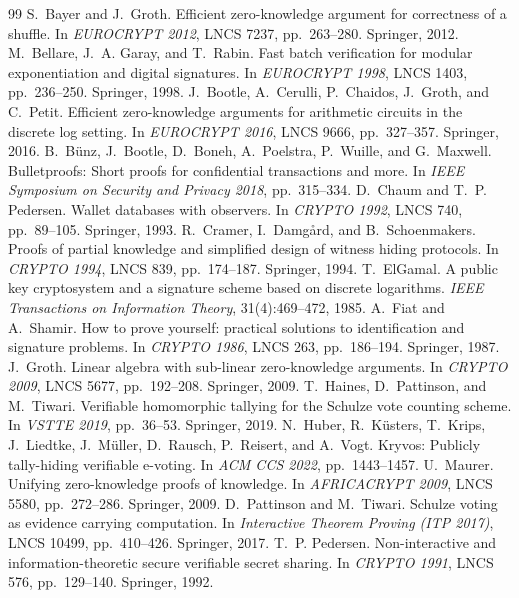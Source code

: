 \documentclass[11pt,a4paper]{article}
\theoremstyle{remark}
\begin{document}
\begin{thebibliography}{99}\small
{} S.~Bayer and J.~Groth. Efficient zero-knowledge argument for correctness of a shuffle. In \emph{EUROCRYPT 2012}, LNCS 7237, pp.~263--280. Springer, 2012.
 M.~Bellare, J.~A. Garay, and T.~Rabin. Fast batch verification for modular exponentiation and digital signatures. In \emph{EUROCRYPT 1998}, LNCS 1403, pp.~236--250. Springer, 1998.
 J.~Bootle, A.~Cerulli, P.~Chaidos, J.~Groth, and C.~Petit. Efficient zero-knowledge arguments for arithmetic circuits in the discrete log setting. In \emph{EUROCRYPT 2016}, LNCS 9666, pp.~327--357. Springer, 2016.
 B.~B{\"u}nz, J.~Bootle, D.~Boneh, A.~Poelstra, P.~Wuille, and G.~Maxwell. Bulletproofs: Short proofs for confidential transactions and more. In \emph{IEEE Symposium on Security and Privacy 2018}, pp.~315--334.
 D.~Chaum and T.~P. Pedersen. Wallet databases with observers. In \emph{CRYPTO 1992}, LNCS 740, pp.~89--105. Springer, 1993.
 R.~Cramer, I.~Damg{\aa}rd, and B.~Schoenmakers. Proofs of partial knowledge and simplified design of witness hiding protocols. In \emph{CRYPTO 1994}, LNCS 839, pp.~174--187. Springer, 1994.
 T.~ElGamal. A public key cryptosystem and a signature scheme based on discrete logarithms. \emph{IEEE Transactions on Information Theory}, 31(4):469--472, 1985.
 A.~Fiat and A.~Shamir. How to prove yourself: practical solutions to identification and signature problems. In \emph{CRYPTO 1986}, LNCS 263, pp.~186--194. Springer, 1987.
 J.~Groth. Linear algebra with sub-linear zero-knowledge arguments. In \emph{CRYPTO 2009}, LNCS 5677, pp.~192--208. Springer, 2009.
 T.~Haines, D.~Pattinson, and M.~Tiwari. Verifiable homomorphic tallying for the Schulze vote counting scheme. In \emph{VSTTE 2019}, pp.~36--53. Springer, 2019.
 N.~Huber, R.~K{\"u}sters, T.~Krips, J.~Liedtke, J.~M{\"u}ller, D.~Rausch, P.~Reisert, and A.~Vogt. Kryvos: Publicly tally-hiding verifiable e-voting. In \emph{ACM CCS 2022}, pp.~1443--1457.
 U.~Maurer. Unifying zero-knowledge proofs of knowledge. In \emph{AFRICACRYPT 2009}, LNCS 5580, pp.~272--286. Springer, 2009.
 D.~Pattinson and M.~Tiwari. Schulze voting as evidence carrying computation. In \emph{Interactive Theorem Proving (ITP 2017)}, LNCS 10499, pp.~410--426. Springer, 2017.
 T.~P. Pedersen. Non-interactive and information-theoretic secure verifiable secret sharing. In \emph{CRYPTO 1991}, LNCS 576, pp.~129--140. Springer, 1992.

\end{thebibliography}
\end{document}
